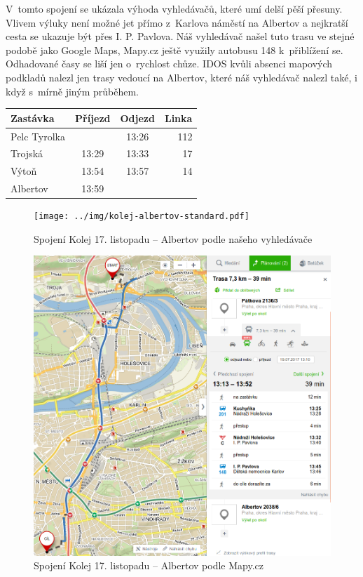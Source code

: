 V~tomto spojení se ukázala výhoda vyhledávačů, které umí delší pěší přesuny.
Vlivem výluky není možné jet přímo z~Karlova náměstí na Albertov a nejkratší
cesta se ukazuje být přes I. P. Pavlova. Náš vyhledávač našel tuto trasu ve
stejné podobě jako Google Maps, Mapy.cz ještě využily autobusu 148 k~přiblížení
se. Odhadované časy se liší jen o~rychlost chůze. IDOS kvůli absenci mapových
podkladů nalezl jen trasy vedoucí na Albertov, které náš vyhledávač nalezl také,
i když s~mírně jiným průběhem. 

\begin{tabular}{|l|c|c|r|}\hline
{\bf Zastávka}&{\bf Příjezd}&{\bf Odjezd}&{\bf Linka}\\\hline
Pelc Tyrolka&&13:26&112\\\hline
Trojská&13:29&13:33&17\\\hline
Výtoň&13:54&13:57&14\\\hline
Albertov&13:59&&\\\hline
\end{tabular} 
\begin{figure}[h]
  \centering
    \texttt{[image: ../img/kolej-albertov-standard.pdf]}
  \caption{Spojení Kolej 17. listopadu -- Albertov podle našeho vyhledávače}
  \label{fig:kolej-albertov-osmawalk}
\end{figure}
\begin{figure}[h]
  \centering
    \includegraphics[width=\textwidth]{../img/kolej-albertov-seznam.png}
  \caption{Spojení Kolej 17. listopadu -- Albertov podle Mapy.cz}
  \label{fig:kolej-albertov-seznam}
\end{figure}
